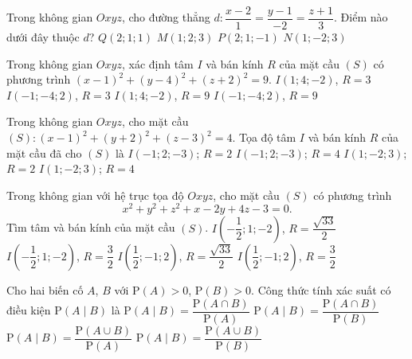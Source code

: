 \documentclass[12pt,a4paper]{article}
\begin{document}
\begin{ex}%
	Trong không gian $Oxyz$, cho đường thẳng $d\colon \dfrac{x-2}{1}=\dfrac{y-1}{-2}=\dfrac{z+1}{3}$. Điểm nào dưới đây thuộc $d$?
	\choice
	{$Q(2;1;1)$}
	{$M(1;2;3)$}
	{\True $P(2;1;-1)$}
	{$N(1;-2;3)$}
\end{ex}

\begin{ex}%
Trong không gian $Oxyz$, xác định tâm $I$ và bán kính $R$ của mặt cầu $(S)$ có phương trình
$(x-1)^2+(y-4)^2+(z+2)^2=9$.
\choice
{\True $I(1;4;-2)$, $R=3$}
{$I(-1;-4;2)$, $R=3$}
{$I(1;4;-2)$, $R=9$}
{$I(-1;-4;2)$, $R=9$}
\end{ex}

\begin{ex}%
Trong không gian $Oxyz$, cho mặt cầu $(S)\colon (x-1)^2+(y+2)^2+(z-3)^2=4$. Tọa độ tâm $I$ và bán kính $R$ của mặt cầu đã cho $(S)$ là
\choice
{$I(-1;2;-3)$; $R=2$}
{$I(-1;2;-3)$; $R=4$}
{\True $I(1;-2;3)$; $R=2$}
{$I(1;-2;3)$; $R=4$}
\end{ex}

\begin{ex}%
Trong không gian với hệ trục tọa độ $Oxyz$, cho mặt cầu $(S)$ có phương trình \[x^2+y^2+z^2+x-2y+4z-3=0.\]
Tìm tâm và bán kính của mặt cầu $(S)$.
\choice
{\True $I\left(-\dfrac{1}{2};1;-2\right)$, $R=\dfrac{\sqrt{33}}{2}$}
{$I\left(-\dfrac{1}{2};1;-2\right)$, $R=\dfrac{3}{2}$}
{$I\left(\dfrac{1}{2};-1;2\right)$, $R=\dfrac{\sqrt{33}}{2}$}
{$I\left(\dfrac{1}{2};-1;2\right)$, $R=\dfrac{3}{2}$}
\end{ex}

\begin{ex}%
	Cho hai biến cố $A$, $B$ với $\mathrm{P}(A)>0$, $\mathrm{P}(B)>0$. Công thức tính xác suất có điều kiện $\mathrm{P}(A\mid B)$ là
	\choice
		{$\mathrm{P}(A\mid B)=\dfrac{\mathrm{P}(A\cap B)}{\mathrm{P}(A)}$}
		{\True $\mathrm{P}(A\mid B)=\dfrac{\mathrm{P}(A\cap B)}{\mathrm{P}(B)}$}
		{$\mathrm{P}(A\mid B)=\dfrac{\mathrm{P}(A\cup B)}{\mathrm{P}(A)}$}
		{$\mathrm{P}(A\mid B)=\dfrac{\mathrm{P}(A\cup B)}{\mathrm{P}(B)}$}
\end{ex}
\end{document}
